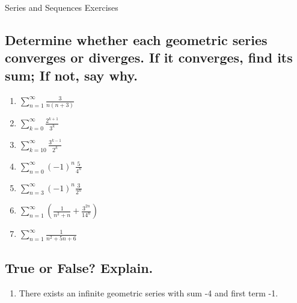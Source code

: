 \documentclass{article}
\begin{document}
\begin{center}
\begin{Huge}Series and Sequences Exercises\end{Huge}
\end{center}


\subsection{Determine whether each geometric series converges or diverges. If it converges, find its sum; If not, say why.}

\begin{multicols}{3}
\begin{enumerate}
\item $\displaystyle \sum_{n=1}^\infty \frac{3}{n(n+3)}$
\item $\displaystyle \sum_{k=0}^{\infty} \frac{2^{k+1}}{3^k}$
\item $\displaystyle \sum_{k=10}^{\infty} \frac{3^{k-1}}{2^k}$
\item $\displaystyle \sum_{n=0}^{\infty}(-1)^n \frac{5}{4^n}$
\item $\displaystyle \sum_{n=3}^{\infty}(-1)^n \frac{3}{2^n}$
\item $\displaystyle \sum_{n=1}^{\infty}\left( \frac{1}{n^2+n} + \frac{3^{2n}}{14^n}\right)$
\item $\displaystyle\sum_{n=1}^{\infty}\frac{1}{n^{2}+5n+6}$
\end{enumerate}
\end{multicols}

\subsection{True or False? Explain. }
\begin{enumerate}
\item There exists an infinite geometric series with sum -4 and first term -1.
\end{enumerate}
\end{document}
